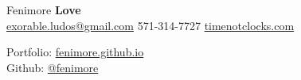 \documentclass[]{deedy-resume-openfont}
\begin{document}
%
%

%
%
\hspace{-5.5mm}
\begin{minipage}[t]{.6\textwidth}
{\Huge Fenimore {\textbf{Love}}}\\
\href{mailto:exorable.ludos@gmail.com}{exorable.ludos@gmail.com} \textbullet{} 571-314-7727 \textbullet{} \href{https://timenotclocks.com}{timenotclocks.com}\\
\end{minipage}
\hfill
\begin{minipage}[t]{.3\textwidth}
Portfolio: \href{https://fenimore.github.io}{fenimore.github.io}\\
Github: \href{https://github.com/fenimore}{@fenimore}
\end{minipage}
\namesection{}{} %

\end{document}
